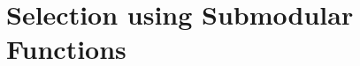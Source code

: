 \documentclass[a4paper,BCOR=10mm]{report}
\begin{document}
\section{Selection using Submodular Functions}


%
%
%
%
%
%
%
%
%
%
\end{document}
